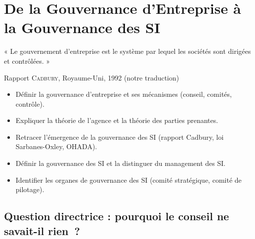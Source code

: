 
\chapter{De la Gouvernance d'Entreprise à la Gouvernance des SI}
\label{chap:gouv-entreprise}

\epigraph{%
    « Le gouvernement d'entreprise est le système par lequel les sociétés
    sont dirigées et contrôlées. »%
}{Rapport \textsc{Cadbury}, Royaume-Uni, 1992 (notre traduction)}


\begin{boxobjectifs}
\begin{itemize}
    \item Définir la gouvernance d'entreprise et ses mécanismes (conseil,
          comités, contrôle).
    \item Expliquer la théorie de l'agence et la théorie des parties
          prenantes.
    \item Retracer l'émergence de la gouvernance des SI (rapport Cadbury,
          loi Sarbanes-Oxley, OHADA).
    \item Définir la gouvernance des SI et la distinguer du management des
          SI.
    \item Identifier les organes de gouvernance des SI (comité stratégique,
          comité de pilotage).
\end{itemize}
\end{boxobjectifs}

\bigskip

\section*{Question directrice : pourquoi le conseil ne savait-il rien~?}

